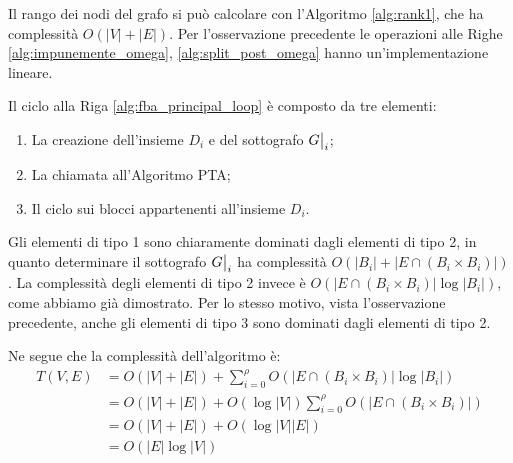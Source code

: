 \begin{proof2}
    Il rango dei nodi del grafo si può calcolare con l'Algoritmo \ref{alg:rank1}, che ha complessità $O(|V|+|E|)$. Per l'osservazione precedente le operazioni alle Righe \ref{alg:impunemente_omega}, \ref{alg:split_post_omega} hanno un'implementazione lineare.

    Il ciclo alla Riga \ref{alg:fba_principal_loop} è composto da tre elementi:
    \begin{enumerate}
        \item La creazione dell'insieme $D_i$ e del sottografo $\restr{G}{i}$;
        \item La chiamata all'Algoritmo PTA;
        \item Il ciclo sui blocci appartenenti all'insieme $D_i$.
    \end{enumerate}
    Gli elementi di tipo 1 sono chiaramente dominati dagli elementi di tipo 2, in quanto determinare il sottografo $\restr{G}{i}$ ha complessità $O(|B_i| + |E \cap (B_i \times B_i)|)$. La complessità degli elementi di tipo 2 invece è $O(|E \cap (B_i \times B_i)| \log |B_i|)$, come abbiamo già dimostrato.  Per lo stesso motivo, vista l'osservazione precedente, anche gli elementi di tipo 3 sono dominati dagli elementi di tipo 2.

    Ne segue che la complessità dell'algoritmo è:
    \begin{align*}
        T(V,E) &= O(|V| + |E|) + \sum_{i=0}^\rho O(|E \cap (B_i \times B_i)| \log |B_i|)\\
        &= O(|V| + |E|) +  O(\log |V|) \sum_{i=0}^\rho O(|E \cap (B_i \times B_i)|)\\
        &= O(|V| + |E|) +  O(\log |V| |E|)\\
        &= O(|E| \log |V|)
    \end{align*}
\end{proof2}
